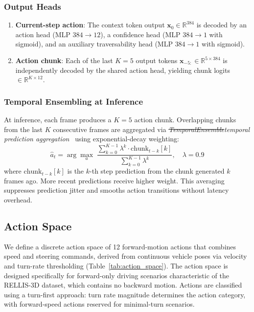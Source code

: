 \documentclass[sensors,article,submit,pdftex,moreauthors]{Definitions/mdpi}
\makeatletter
\providecommand{\DIFadd}[1]{{\protect\color{red}#1}} %
\providecommand{\DIFdel}[1]{{\protect\color{red}\sout{#1}}} %
\providecommand{\DIFaddbegin}{} %
\providecommand{\DIFaddend}{} %
\providecommand{\DIFdelbegin}{} %
\providecommand{\DIFdelend}{} %
\providecommand{\DIFscaledelfig}{0.5}
\newlength{\DIFdelgraphicswidth} %
\newlength{\DIFdelgraphicsheight} %
\providecommand{\DIFaddincludegraphics}[2][]{{\color{blue}\fbox{\DIFOincludegraphics[#1]{#2}}}} %
\providecommand{\DIFdelincludegraphics}[2][]{%
\sbox{\DIFdelgraphicsbox}{\DIFOincludegraphics[#1]{#2}}%
\settoboxwidth{\DIFdelgraphicswidth}{\DIFdelgraphicsbox} %
\settoboxtotalheight{\DIFdelgraphicsheight}{\DIFdelgraphicsbox} %
\scalebox{\DIFscaledelfig}{%
\parbox[b]{\DIFdelgraphicswidth}{\usebox{\DIFdelgraphicsbox}\\[-\baselineskip] \rule{\DIFdelgraphicswidth}{0em}}\llap{\resizebox{\DIFdelgraphicswidth}{\DIFdelgraphicsheight}{%
\setlength{\unitlength}{\DIFdelgraphicswidth}%
\begin{picture}(1,1)%
\thicklines\linethickness{2pt} %
{\color[rgb]{1,0,0}\put(0,0){\framebox(1,1){}}}%
{\color[rgb]{1,0,0}\put(0,0){\line( 1,1){1}}}%
{\color[rgb]{1,0,0}\put(0,1){\line(1,-1){1}}}%
\end{picture}%
}\hspace*{3pt}}} %
} %
\DeclareRobustCommand{\DIFaddbegin}{\DIFOaddbegin \let\includegraphics\DIFaddincludegraphics} %
\DeclareRobustCommand{\DIFaddend}{\DIFOaddend \let\includegraphics\DIFOincludegraphics} %
\DeclareRobustCommand{\DIFdelbegin}{\DIFOdelbegin \let\includegraphics\DIFdelincludegraphics} %
\DeclareRobustCommand{\DIFdelend}{\DIFOaddend \let\includegraphics\DIFOincludegraphics} %
\let\sout@orig\sout %
\renewcommand{\sout}[1]{\ifmmode\text{\sout@orig{\ensuremath{#1}}}\else\sout@orig{#1}\fi} %
\makeatother
\begin{document}
\subsubsection{Output Heads}
\begin{enumerate}
    \item \textbf{Current-step action}: The context token output $\mathbf{x}_0 \in \mathbb{R}^{384}$ is decoded by an action head (MLP $384{\to}12$), a confidence head (MLP $384{\to}1$ with sigmoid), and an auxiliary traversability head (MLP $384{\to}1$ with sigmoid).
    \item \textbf{Action chunk}: Each of the last $K{=}5$ output tokens $\mathbf{x}_{-5:} \in \mathbb{R}^{5 \times 384}$ is independently decoded by the shared action head, yielding chunk logits $\in \mathbb{R}^{K \times 12}$.
\end{enumerate}

\subsubsection{Temporal Ensembling at Inference}
At inference, each frame produces a $K{=}5$ action chunk. Overlapping chunks from the last $K$ consecutive frames are aggregated via \emph{\DIFdelbegin \DIFdel{TemporalEnsemble}\DIFdelend \DIFaddbegin \DIFadd{temporal prediction aggregation}\DIFaddend }~\cite{zhao2023act} using exponential-decay weighting:
\begin{equation}
    \hat{a}_t = \arg\max_a \;\frac{\displaystyle\sum_{k=0}^{K-1} \lambda^k \cdot \text{chunk}_{t-k}[k]}{\displaystyle\sum_{k=0}^{K-1} \lambda^k},
    \quad \lambda = 0.9
\end{equation}
where $\text{chunk}_{t-k}[k]$ is the $k$-th step prediction from the chunk generated $k$ frames ago. More recent predictions receive higher weight. This averaging suppresses prediction jitter and smooths action transitions without latency overhead.

\subsection{Action Space}
\label{sec:action_space}

We define a discrete action space of 12 forward-motion actions that combines speed and steering commands, derived from continuous vehicle poses via velocity and turn-rate thresholding (Table~\ref{tab:action_space}). The action space is designed specifically for forward-only driving scenarios characteristic of the RELLIS-3D dataset, which contains no backward motion. Actions are classified using a turn-first approach: turn rate magnitude determines the action category, with forward-speed actions reserved for minimal-turn scenarios.
\end{document}
